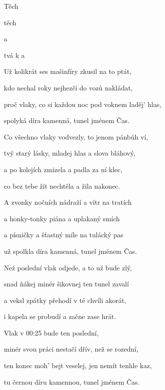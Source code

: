 

\zs
Těch    

těch    

a    

tvá  k  a  
\ks

\zs
Už kolikrát ses mašinfíry zkusil na to ptát,

kdo nechal roky nejhezčí do vozů nakládat,

proč vlaky, co si každou noc pod voknem laděj' hlas,

spolyká díra kamenná, tunel jménem Čas.
\ks

\zs
Co všechno vlaky vodvezly, to jenom pánbůh ví,

tvý starý lásky, mladej hlas a slova bláhový,

a po kolejích zmizela a padla za ní klec,

co bez tebe žít nechtěla a žila nakonec.
\ks

\zs
A zvonky nočních nádraží a vítr na tratích

a honky-tonky piána a uplakaný smích

a písničky a šťastný míle na tulácký pas

už spolkla díra kamenná, tunel jménem Čas.
\ks

\zs
Než poslední vlak odjede, a to už bude zlý,

snad ňákej minér šikovnej ten tunel zavalí

a veksl zpátky přehodí v té chvíli akorát,

i kapela se probudí a začne zase hrát.
\ks

\zs
Vlak v 00:25 bude ten poslední,

minér svou práci nestačí dřív, než se rozední,

ten konec moh' bejt veselej, jen nemít tenhle kaz,

tu černou díru kamennou, tunel jménem Čas.
\ks

\kp
